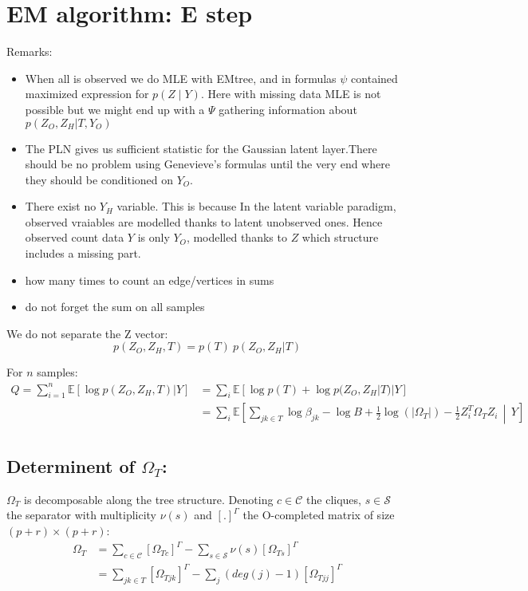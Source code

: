 \documentclass[11pt,a4paper]{article}
\newcommand{\Esp}{\mathds{E}}
\begin{document}
\section{EM algorithm: E step}

Remarks:
\begin{itemize}
\item When all is observed we do MLE with EMtree, and in formulas $\psi$ contained maximized expression for $p(Z \mid Y)$. Here with missing data MLE is not possible but we might end up with a $\Psi$ gathering information about $ p(Z_O,Z_H|T,Y_O)$
\item The PLN gives us sufficient statistic for the Gaussian latent layer.There should be no problem using Genevieve's formulas until the very end where they should be conditioned on $Y_O$.
\item There exist no $Y_H$ variable. This is because In the latent variable paradigm, observed vraiables are modelled thanks to latent unobserved ones. Hence observed count data $Y$ is only $Y_O$, modelled thanks to $Z$ which structure includes a  missing part.
\item how many times to count an edge/vertices in sums 
\item do not forget the sum on all samples
\end{itemize}



We do not separate the Z vector:
$$p(Z_O,Z_H,T) = p(T) \: p(Z_O,Z_H|T)$$

For $n$ samples:
\begin{align*}
Q= \sum_{i=1}^{n} \Esp[\log p(Z_O,Z_H,T) | Y ] &= \sum_i  \Esp[\log p(T)+\log p(Z_O,Z_H|T)|Y] \\
  &=\sum_i \Esp\left[\sum_{jk \in T} \log \beta_{jk} - \log B + \frac{1}{2} \log(|\Omega_T|) - \frac{1}{2} Z_i^T \Omega_T Z_i\,\middle\vert\,  Y\right]\\
\end{align*} 


\subsection{Determinent of $\Omega_T$:\\}
$\Omega_T$ is decomposable along the tree structure. Denoting $c\in\mathcal{C}$ the cliques, $s\in \mathcal{S}$ the separator with multiplicity $\nu(s)$ and $[.]^\Gamma$ the O-completed matrix of size $(p+r)\times(p+r)$:
\begin{align*}
\Omega_T &= \sum_{c\in \mathcal{C}} [\Omega_{Tc}]^\Gamma - \sum_{s \in\mathcal{S}} \nu(s)[\Omega_{Ts}]^\Gamma\\
&= \sum_{jk \in T} [\Omega_{Tjk}]^\Gamma - \sum_j (deg(j)-1)[\Omega_{Tjj}]^\Gamma
\end{align*}
\end{document}
